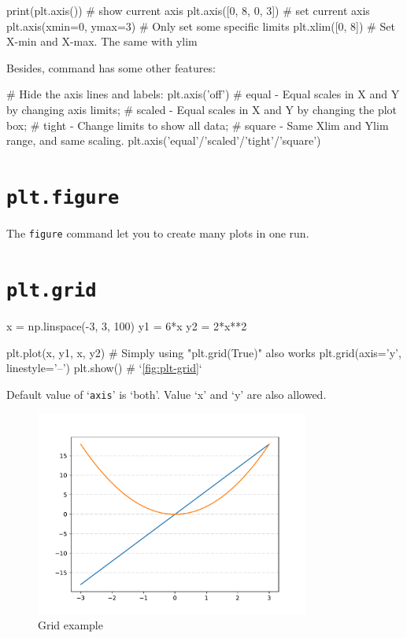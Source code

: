 \documentclass{report}
\begin{document}
\begin{py}
print(plt.axis()) # show current axis
plt.axis([0, 8, 0, 3]) # set current axis
plt.axis(xmin=0, ymax=3) # Only set some specific limits
plt.xlim([0, 8]) # Set X-min and X-max. The same with ylim
\end{py}

Besides,  command has some other features:
\begin{py}
# Hide the axis lines and labels:
plt.axis('off')
# equal - Equal scales in X and Y by changing axis limits;
# scaled - Equal scales in X and Y by changing the plot box;
# tight - Change limits to show all data; 
# square - Same Xlim and Ylim range, and same scaling.
plt.axis('equal'/'scaled'/'tight'/'square')
\end{py}

\section{\texttt{plt.figure}}
The \texttt{figure} command let you to create many plots in one run. 

\section{\texttt{plt.grid}} 
\begin{py}
x = np.linspace(-3, 3, 100)
y1 = 6*x
y2 = 2*x**2

plt.plot(x, y1, x, y2)
# Simply using "plt.grid(True)" also works
plt.grid(axis='y', linestyle='--')
plt.show() # `\autoref{fig:plt-grid}`
\end{py}

Default value of `\texttt{axis}' is `both'. Value `x' and `y' are also allowed.

\begin{figure}[!htb]
  \centering
  \includegraphics[width=90mm]{plt-grid}
  \caption{Grid example}
  \label{fig:plt-grid}
\end{figure}
\end{document}
